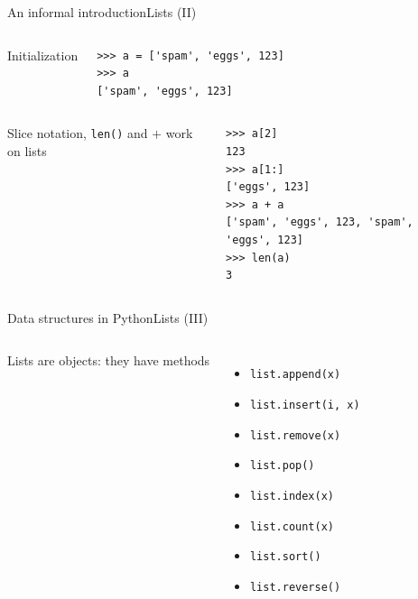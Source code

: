 \documentclass[10pt,compress]{beamer} %
\begin{document}
\begin{frame}[fragile]{An informal introduction}{Lists (II)}
    \vspace{-0.7cm}
	\begin{columns}
		Initialization

		\begin{exampleblock}{}
		\begin{verbatim}
>>> a = ['spam', 'eggs', 123]
>>> a
['spam', 'eggs', 123]
\end{verbatim}
		\end{exampleblock}
	\end{columns}

	\begin{columns}
 	   	\column{.30\textwidth}
		Slice notation, \texttt{len()} and $+$ work on lists

   		\column{.70\textwidth}
		\begin{exampleblock}{}
		\begin{verbatim}
>>> a[2]
123
>>> a[1:]
['eggs', 123]
>>> a + a
['spam', 'eggs', 123, 'spam', 'eggs', 123]
>>> len(a)
3
\end{verbatim}
		\end{exampleblock}
	\end{columns}
\end{frame}

\begin{frame}{Data structures in Python}{Lists (III)}
    \begin{columns}
 	   \column{.40\textwidth}
	   Lists are objects: they have methods
	\begin{itemize}
		\item \texttt{list.append(x)}
		\item \texttt{list.insert(i, x)}
		\item \texttt{list.remove(x)}
		\item \texttt{list.pop()}
		\item \texttt{list.index(x)}
		\item \texttt{list.count(x)}
		\item \texttt{list.sort()}
		\item \texttt{list.reverse()}
	\end{itemize}

 	   \column{.60\textwidth}
        \scriptsize{
		\begin{exampleblock}{}
		\vspace{-0.4cm}
		
		\vspace{-0.2cm}
		\end{exampleblock}
		}
   \end{columns}
\end{frame}
\end{document}
